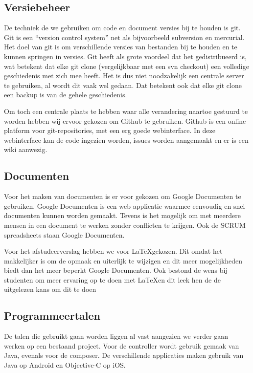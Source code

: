 \documentclass[]{article}
\begin{document}
\subsection{Versiebeheer}
De techniek de we gebruiken om code en document versies bij te houden is
git. Git is een “version control system” net als bijvoorbeeld subversion en
mercurial. Het doel van git is om verschillende versies van bestanden bij
te houden en te kunnen springen in versies. Git heeft als grote voordeel
dat het gedistribueerd is, wat betekent dat elke git clone (vergelijkbaar
met een svn checkout) een volledige geschiedenis met zich mee heeft. Het is
dus niet noodzakelijk een centrale server te gebruiken, al wordt dit vaak
wel gedaan. Dat betekent ook dat elke git clone een backup is van de gehele
geschiedenis.

Om toch een centrale plaats te hebben waar alle verandering naartoe
gestuurd te worden hebben wij ervoor gekozen om Github te gebruiken. Github
is een online platform voor git-repositories, met een erg goede
webinterface. In deze webinterface kan de code ingezien worden, issues
worden aangemaakt en er is een wiki aanwezig.

\subsection{Documenten}
Voor het maken van documenten is er voor gekozen om Google Documenten te
gebruiken. Google Documenten is een web applicatie waarmee eenvoudig en
snel documenten kunnen worden gemaakt. Tevens is het mogelijk om met
meerdere mensen in een document te werken zonder conflicten te krijgen. Ook
de SCRUM spreadsheets staan Google Documenten.

Voor het afstudeerverslag hebben we voor \LaTeX gekozen. Dit omdat het
makkelijker is om de opmaak en uiterlijk te wijzigen en dit meer mogelijkheden
biedt dan het meer beperkt Google Documenten. Ook bestond de wens bij studenten
om meer ervaring op te doen met \LaTeX en dit leek hen de de uitgelezen kans om
dit te doen

\subsection{Programmeertalen}
De talen die gebruikt gaan worden liggen al vast aangezien we verder gaan
werken op een bestaand project. Voor de controller wordt gebruik gemaak van
Java, evenals voor de composer. De verschillende applicaties maken gebruik
van Java op Android en Objective-C op iOS.
\end{document}
